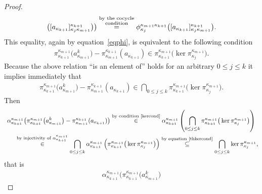 \documentclass[pdftex]{sigma}
\begin{document}
\begin{proof}
\begin{gather*}
 \big([a_{\kappa_{k+1}}]^{\kappa_{k+1}}_{\kappa_j\kappa_{m+1}}
\big) \big)
\overset{\substack{\text{by the cocycle} \\ \text{condition\vphantom{q}}}}{=} \phi^{\kappa_{m+1}\kappa_{k+1}}_{\kappa_j}\big([a_{\kappa_{k+1}}]^{\kappa_{k+1}}_{\kappa_j\kappa_{m+1}}\big).
\end{gather*}
This equality, again by equation~\eqref{eqphi}, is equivalent to the following condition
\begin{gather*}
\pi^{\kappa_{m+1}}_{\kappa_{k+1}}\big(a^k_{\kappa_{m+1}}\big)-\pi^{\kappa_{k+1}}_{\kappa_{m+1}}(a_{\kappa_{k+1}})
\in\pi^{\kappa_{m+1}}_{\kappa_{k+1}}\big(\ker\pi^{\kappa_{m+1}}_{\kappa_j}\big).
\end{gather*}
Because the above relation ``is an element of'' holds for an arbitrary $0\leq j\leq k$ it implies immediately that
\begin{gather}
\label{kercond}
\pi^{\kappa_{m+1}}_{\kappa_{k+1}}\big(a^k_{\kappa_{m+1}}\big)-\pi^{\kappa_{k+1}}_{\kappa_{m+1}}(a_{\kappa_{k+1}})
\in\bigcap_{0\leq j\leq k}\pi^{\kappa_{m+1}}_{\kappa_{k+1}}\big(\ker\pi^{\kappa_{m+1}}_{\kappa_j}\big).
\end{gather}
Then
\begin{gather*}
\alpha^{\kappa_{m+1}}_{\kappa_{k+1}}\big(\pi^{\kappa_{m+1}}_{\kappa_{k+1}}\big(a^k_{\kappa_{m+1}}\big)
-\pi^{\kappa_{k+1}}_{\kappa_{m+1}}(a_{\kappa_{k+1}})\big)
\overset{\text{by condition~\eqref{kercond}}}{\in}
\alpha^{\kappa_{m+1}}_{\kappa_{k+1}}\left(\bigcap_{0\leq j\leq k}\pi^{\kappa_{m+1}}_{\kappa_{k+1}}\big(\ker\pi^{\kappa_{m+1}}_{\kappa_j}\big) \right)
\\
\qquad
\overset{\text{by injectivity of $\alpha^{\kappa_{m+1}}_{\kappa_{k+1}}$}}{\in}
\bigcap_{0\leq j\leq k}
\alpha^{\kappa_{m+1}}_{\kappa_{k+1}}\left(\pi^{\kappa_{m+1}}_{\kappa_{k+1}}\big(\ker\pi^{\kappa_{m+1}}_{\kappa_j}\big)\right)
\overset{\text{by equation~\eqref{thkercond}}}{\subseteq}
\bigcap_{0\leq j\leq k}\ker\pi^{\kappa_{m+1}}_{\kappa_j},
\end{gather*}
that is
\begin{gather*}
\alpha^{\kappa_{m+1}}_{\kappa_{k+1}}\big(\pi^{\kappa_{m+1}}_{\kappa_{k+1}}\big(a^k_{\kappa_{m+1}}\big)

\end{gather*}
\end{proof}
\end{document}
